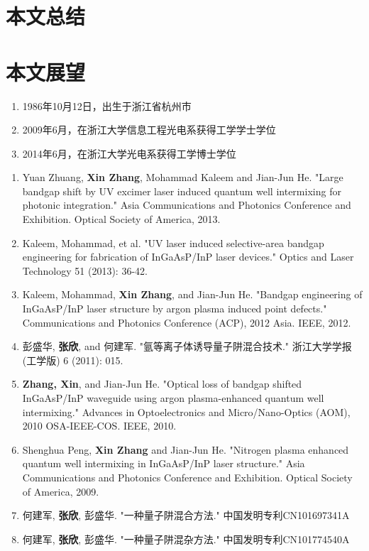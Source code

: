 \documentclass{ZJUthesis}
\begin{document}
\section{本文总结}

\section{本文展望}

\ZJUbackmatter



\begin{resume}
\begin{enumerate}
\item{1986年10月12日，出生于浙江省杭州市}
\item{2009年6月，在浙江大学信息工程光电系获得工学学士学位}
\item{2014年6月，在浙江大学光电系获得工学博士学位}
\end{enumerate}
\end{resume}

\begin{publications}
\begin{enumerate}
\item{Yuan Zhuang, \textbf{Xin Zhang}, Mohammad Kaleem and Jian-Jun He. "Large bandgap shift by UV excimer laser induced quantum well intermixing for photonic integration." Asia Communications and Photonics Conference and Exhibition. Optical Society of America, 2013.}
\item{Kaleem, Mohammad, et al. "UV laser induced selective-area bandgap engineering for fabrication of InGaAsP/InP laser devices." Optics and Laser Technology 51 (2013): 36-42.}
\item{Kaleem, Mohammad, \textbf{Xin Zhang}, and Jian-Jun He. "Bandgap engineering of InGaAsP/InP laser structure by argon plasma induced point defects." Communications and Photonics Conference (ACP), 2012 Asia. IEEE, 2012.}
\item{彭盛华, \textbf{张欣}, and 何建军. "氩等离子体诱导量子阱混合技术." 浙江大学学报 (工学版) 6 (2011): 015.}
\item{\textbf{Zhang, Xin}, and Jian-Jun He. "Optical loss of bandgap shifted InGaAsP/InP waveguide using argon plasma-enhanced quantum well intermixing." Advances in Optoelectronics and Micro/Nano-Optics (AOM), 2010 OSA-IEEE-COS. IEEE, 2010.}
\item{Shenghua Peng, \textbf{Xin Zhang} and Jian-Jun He. "Nitrogen plasma enhanced quantum well intermixing in InGaAsP/InP laser structure." Asia Communications and Photonics Conference and Exhibition. Optical Society of America, 2009.}
\item{何建军, \textbf{张欣}, 彭盛华. "一种量子阱混合方法." 中国发明专利CN101697341A}
\item{何建军, \textbf{张欣}, 彭盛华. "一种量子阱混杂方法." 中国发明专利CN101774540A}
\end{enumerate}
\end{publications}
\end{document}
